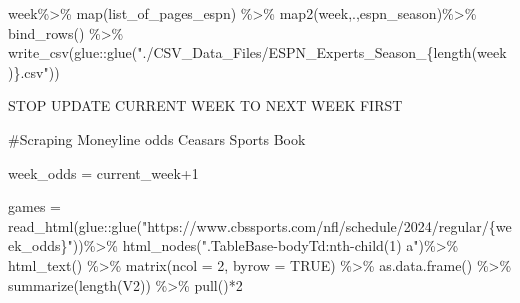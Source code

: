 \documentclass[
]{article}
\newenvironment{Shaded}{\begin{snugshade}}{\end{snugshade}}
\newcommand{\AttributeTok}[1]{\textcolor[rgb]{0.77,0.63,0.00}{#1}}
\newcommand{\ConstantTok}[1]{\textcolor[rgb]{0.00,0.00,0.00}{#1}}
\newcommand{\DecValTok}[1]{\textcolor[rgb]{0.00,0.00,0.81}{#1}}
\newcommand{\FunctionTok}[1]{\textcolor[rgb]{0.00,0.00,0.00}{#1}}
\newcommand{\NormalTok}[1]{#1}
\newcommand{\OtherTok}[1]{\textcolor[rgb]{0.56,0.35,0.01}{#1}}
\newcommand{\SpecialCharTok}[1]{\textcolor[rgb]{0.00,0.00,0.00}{#1}}
\newcommand{\StringTok}[1]{\textcolor[rgb]{0.31,0.60,0.02}{#1}}
\begin{document}
\begin{Shaded}
\begin{Highlighting}[]
\NormalTok{week}\SpecialCharTok{\%\textgreater{}\%}
  \FunctionTok{map}\NormalTok{(list\_of\_pages\_espn) }\SpecialCharTok{\%\textgreater{}\%} 
  \FunctionTok{map2}\NormalTok{(week,.,espn\_season)}\SpecialCharTok{\%\textgreater{}\%}
  \FunctionTok{bind\_rows}\NormalTok{() }\SpecialCharTok{\%\textgreater{}\%} 
  \FunctionTok{write\_csv}\NormalTok{(glue}\SpecialCharTok{::}\FunctionTok{glue}\NormalTok{(}\StringTok{"./CSV\_Data\_Files/ESPN\_Experts\_Season\_\{length(week)\}.csv"}\NormalTok{))}
\end{Highlighting}
\end{Shaded}

STOP UPDATE CURRENT WEEK TO NEXT WEEK FIRST

\#Scraping Moneyline odds Ceasars Sports Book

\begin{Shaded}
\begin{Highlighting}[]
\NormalTok{week\_odds }\OtherTok{=}\NormalTok{ current\_week}\SpecialCharTok{+}\DecValTok{1}
  
\NormalTok{games }\OtherTok{=} \FunctionTok{read\_html}\NormalTok{(glue}\SpecialCharTok{::}\FunctionTok{glue}\NormalTok{(}\StringTok{"https://www.cbssports.com/nfl/schedule/2024/regular/\{week\_odds\}"}\NormalTok{))}\SpecialCharTok{\%\textgreater{}\%}
    \FunctionTok{html\_nodes}\NormalTok{(}\StringTok{".TableBase{-}bodyTd:nth{-}child(1) a"}\NormalTok{)}\SpecialCharTok{\%\textgreater{}\%}
    \FunctionTok{html\_text}\NormalTok{() }\SpecialCharTok{\%\textgreater{}\%} 
    \FunctionTok{matrix}\NormalTok{(}\AttributeTok{ncol =} \DecValTok{2}\NormalTok{, }\AttributeTok{byrow =} \ConstantTok{TRUE}\NormalTok{) }\SpecialCharTok{\%\textgreater{}\%}
    \FunctionTok{as.data.frame}\NormalTok{() }\SpecialCharTok{\%\textgreater{}\%} 
    \FunctionTok{summarize}\NormalTok{(}\FunctionTok{length}\NormalTok{(V2)) }\SpecialCharTok{\%\textgreater{}\%} 
    \FunctionTok{pull}\NormalTok{()}\SpecialCharTok{*}\DecValTok{2}



\end{Highlighting}
\end{Shaded}
\end{document}
